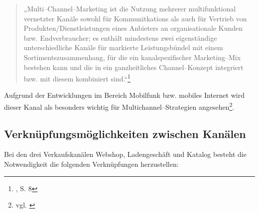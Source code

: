 \begin{quote}„Multi--Channel--Marketing ist die Nutzung mehrerer multifunktional vernetzter Kanäle sowohl für Kommunitkations als auch für Vertrieb von Produkten/Dienstleistungen eines Anbieters an organisationale Kunden bzw. Endverbraucher; es enthält mindestens zwei eigenständige unterschiedliche Kanäle für markierte Leistungsbündel mit einem Sortimentszusammenhang, für die ein kanalspezifischer Marketing--Mix bestehen kann und die in ein ganzheitliches Channel--Konzept integriert bzw. mit diesem kombiniert sind.“\footnote{\cite{emrich}, S. 8}\end{quote} 

Aufgrund der Entwicklungen im Bereich Mobilfunk bzw. mobiles Internet wird dieser Kanal als besonders wichtig für Multichannel--Strategien angesehen\footnote{vgl. \cite{mohlenbruch}}.

\subsection{Verknüpfungsmöglichkeiten zwischen Kanälen}

Bei den drei Verkaufskanälen Webshop, Ladengeschäft und Katalog besteht die Notwendigkeit die folgenden Verknüpfungen herzustellen:

